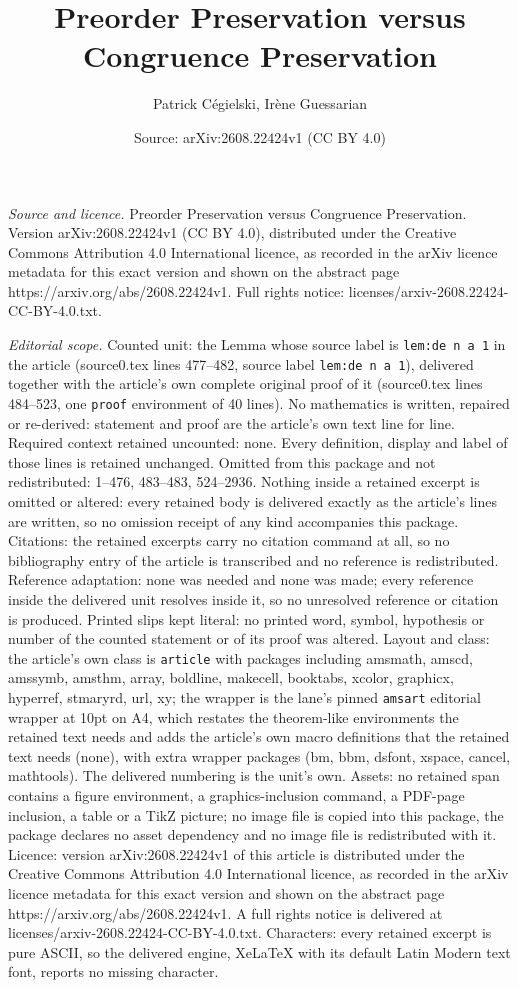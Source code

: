 \documentclass[10pt,a4paper]{amsart}
\title[Preorder Preservation versus Congruence Preservation]{Preorder Preservation versus Congruence Preservation}
\author{Patrick C\'egielski, Ir\`ene Guessarian}
\date{Source: arXiv:2608.22424v1 (CC BY 4.0)}
\begin{document}
\maketitle

\noindent\emph{Source and licence.} Preorder Preservation versus Congruence Preservation. Version arXiv:2608.22424v1 (CC BY 4.0), distributed under the Creative Commons Attribution 4.0 International licence, as recorded in the arXiv licence metadata for this exact version and shown on the abstract page https://arxiv.org/abs/2608.22424v1. Full rights notice: licenses/arxiv-2608.22424-CC-BY-4.0.txt.\par\smallskip

\noindent\textit{Editorial scope.} Counted unit: the Lemma whose source label is \texttt{lem:de n a 1} in the article (source0.tex lines 477--482, source label \texttt{lem:de n a 1}), delivered together with the article's own complete original proof of it (source0.tex lines 484--523, one \texttt{proof} environment of 40 lines). No mathematics is written, repaired or re-derived: statement and proof are the article's own text line for line. Required context retained uncounted: none. Every definition, display and label of those lines is retained unchanged. Omitted from this package and not redistributed: 1--476, 483--483, 524--2936. Nothing inside a retained excerpt is omitted or altered: every retained body is delivered exactly as the article's lines are written, so no omission receipt of any kind accompanies this package. Citations: the retained excerpts carry no citation command at all, so no bibliography entry of the article is transcribed and no reference is redistributed. Reference adaptation: none was needed and none was made; every reference inside the delivered unit resolves inside it, so no unresolved reference or citation is produced. Printed slips kept literal: no printed word, symbol, hypothesis or number of the counted statement or of its proof was altered. Layout and class: the article's own class is \texttt{article} with packages including amsmath, amscd, amssymb, amsthm, array, boldline, makecell, booktabs, xcolor, graphicx, hyperref, stmaryrd, url, xy; the wrapper is the lane's pinned \texttt{amsart} editorial wrapper at 10pt on A4, which restates the theorem-like environments the retained text needs and adds the article's own macro definitions that the retained text needs (none), with extra wrapper packages (bm, bbm, dsfont, xspace, cancel, mathtools). The delivered numbering is the unit's own. Assets: no retained span contains a figure environment, a graphics-inclusion command, a PDF-page inclusion, a table or a TikZ picture; no image file is copied into this package, the package declares no asset dependency and no image file is redistributed with it. Licence: version arXiv:2608.22424v1 of this article is distributed under the Creative Commons Attribution 4.0 International licence, as recorded in the arXiv licence metadata for this exact version and shown on the abstract page https://arxiv.org/abs/2608.22424v1. A full rights notice is delivered at licenses/arxiv-2608.22424-CC-BY-4.0.txt. Characters: every retained excerpt is pure ASCII, so the delivered engine, XeLaTeX with its default Latin Modern text font, reports no missing character.
\end{document}
